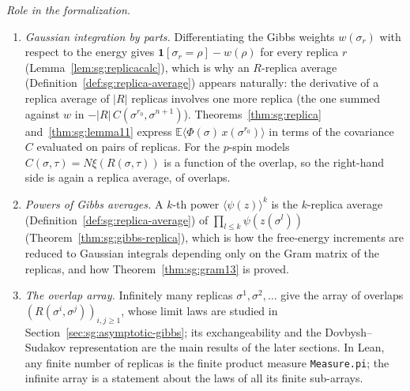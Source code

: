 \begin{remark}
\emph{Role in the formalization.}
\begin{enumerate}
\item \emph{Gaussian integration by parts.} Differentiating the Gibbs weights $w(\sigma_r)$ with respect to the energy gives
  $\mathbf 1[\sigma_r=\rho]-w(\rho)$ for every replica $r$ (Lemma~\ref{lem:sg:replicacalc}), which is why an
  $R$-replica average (Definition~\ref{def:sg:replica-average}) appears naturally: the derivative of a replica average of $|R|$ replicas involves one more replica
  (the one summed against $w$ in $-|R|\,C(\sigma^{r_0},\sigma^{n+1})$). Theorems~\ref{thm:sg:replica} and~\ref{thm:sg:lemma11}
  express $\mathbb E\langle\Phi(\sigma)\,x(\sigma^{r_0})\rangle$ in terms of the covariance $C$ evaluated on pairs of replicas. For
  the $p$-spin models $C(\sigma,\tau)=N\xi(R(\sigma,\tau))$ is a function of the overlap, so the right-hand side is again a
  replica average, of overlaps.
\item \emph{Powers of Gibbs averages.} A $k$-th power $\langle\psi(z)\rangle^k$ is the $k$-replica average (Definition~\ref{def:sg:replica-average}) of
  $\prod_{l\le k}\psi(z(\sigma^l))$ (Theorem~\ref{thm:sg:gibbs-replica}), which is how the free-energy increments
  are reduced to Gaussian integrals depending only on the Gram matrix of the replicas, and how Theorem~\ref{thm:sg:gram13} is proved.
\item \emph{The overlap array.} Infinitely many replicas $\sigma^1,\sigma^2,\dots$ give the array of overlaps
  $(R(\sigma^i,\sigma^j))_{i,j\ge1}$, whose limit laws are studied in Section~\ref{sec:sg:asymptotic-gibbs}; its
  exchangeability and the Dovbysh--Sudakov representation are the main results of the later sections. In Lean, any finite number of replicas
  is the finite product measure \texttt{Measure.pi}; the infinite array is a statement about the laws of all its finite sub-arrays.
\end{enumerate}


\end{remark}
